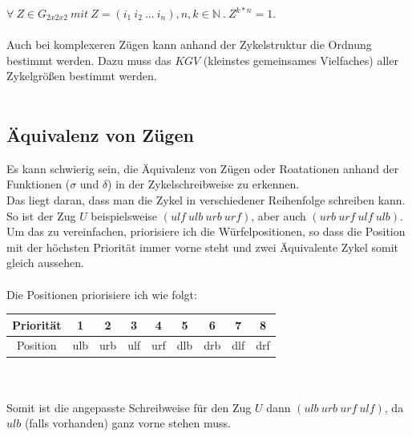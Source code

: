 \documentclass[12pt,a4paper, usenames, dvipsnames]{article}
\begin{document}
${\forall \ Z \in G_{2x2x2}\ mit \ Z=(i_1 \ i_2 \ ... \ i_n), n,k \in \mathbb{N} \ . \  Z^{k*n}=1 }$.
\\
\\
Auch bei komplexeren Zügen kann anhand der Zykelstruktur die Ordnung bestimmt werden. Dazu muss das $KGV$ (kleinstes gemeinsames Vielfaches) aller Zykelgrößen bestimmt werden.
\\
\\


























\subsection*{Äquivalenz von Zügen}


Es kann schwierig sein, die Äquivalenz von Zügen oder Roatationen anhand der Funktionen ($\sigma$ und $\delta$) in der Zykelschreibweise zu erkennen. \\
Das liegt daran, dass man die Zykel in verschiedener Reihenfolge schreiben kann. So ist der Zug $U$ beispielsweise $ (ulf \ ulb \ urb \ urf)$, aber auch $(urb \ urf \ ulf \ ulb)$.
\\
Um das zu vereinfachen, priorisiere ich die Würfelpositionen, so dass die Position mit der höchsten Priorität immer vorne steht und zwei Äquivalente Zykel somit gleich aussehen. \\
\\
Die Positionen priorisiere ich wie folgt: \\
\begin{tabular}{|c||c|c|c|c|c|c|c|c|}
\hline
Priorität & 1 & 2 & 3 & 4 & 5 & 6 & 7 & 8 \\
\hline
Position  & ulb & urb & ulf & urf & dlb & drb & dlf & drf \\
\hline
\end{tabular}
\ \\ \\
Somit ist die angepasste Schreibweise für den Zug $U$ dann $(ulb \ urb \ urf \ ulf)$, da $ulb$ (falls vorhanden) ganz vorne stehen muss.
\end{document}
